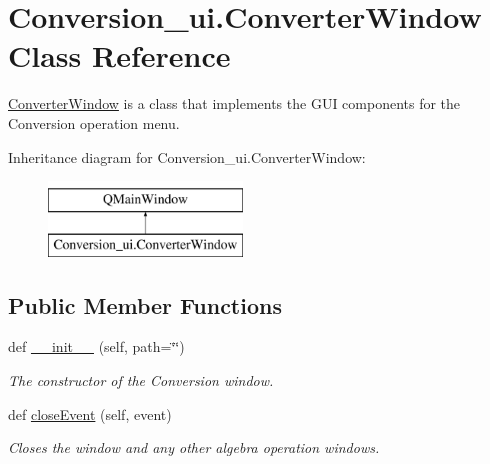 \hypertarget{class_conversion__ui_1_1_converter_window}{}\section{Conversion\+\_\+ui.\+Converter\+Window Class Reference}
\label{class_conversion__ui_1_1_converter_window}


\hyperlink{class_conversion__ui_1_1_converter_window}{Converter\+Window} is a class that implements the G\+UI components for the Conversion operation menu.  


Inheritance diagram for Conversion\+\_\+ui.\+Converter\+Window\+:\begin{figure}[H]
\begin{center}
\leavevmode
\includegraphics[height=2.000000cm]{class_conversion__ui_1_1_converter_window}
\end{center}
\end{figure}
\subsection*{Public Member Functions}
\begin{DoxyCompactItemize}
\item 
def \hyperlink{class_conversion__ui_1_1_converter_window_a3ae25e516ec55570394c9a171301dd02}{\+\_\+\+\_\+init\+\_\+\+\_\+} (self, path=\char`\"{}\char`\"{})
\begin{DoxyCompactList}\small\item\em The constructor of the Conversion window. \end{DoxyCompactList}\item 
\mbox{\label{class_conversion__ui_1_1_converter_window_aaee56f8ee6fd351084f195e77feed082}} 
def \hyperlink{class_conversion__ui_1_1_converter_window_aaee56f8ee6fd351084f195e77feed082}{close\+Event} (self, event)
\begin{DoxyCompactList}\small\item\em Closes the window and any other algebra operation windows. \end{DoxyCompactList}\end{DoxyCompactItemize}
